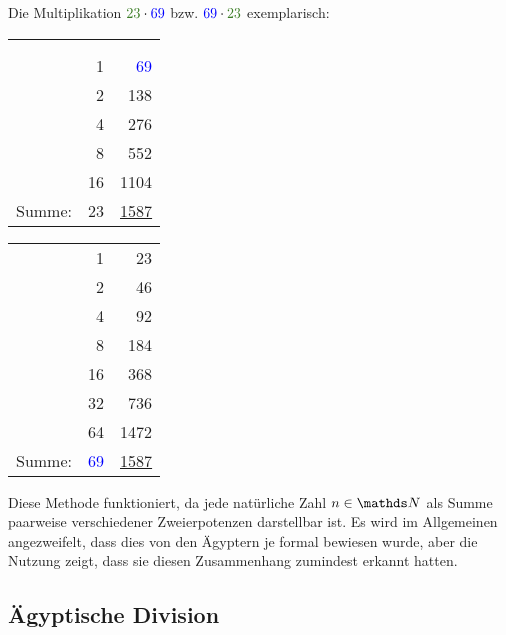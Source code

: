 	\begin{bsp}\label{Bsp: EgypMult}
		Die Multiplikation $\textcolor{OliveGreen}{23} \cdot \textcolor{blue}{69}$ bzw. $\textcolor{blue}{69} \cdot \textcolor{OliveGreen}{23}$ exemplarisch:\\
		\begin{minipage}{.5\textwidth}
				\begin{center}
				\begin{tabular}{r r r}
					&&\\
					&&\\
					\checkmark &1 & \textcolor{blue}{69}\\
					\checkmark &2 & 138\\
					\checkmark &4 & 276\\
					&8 & 552\\
					\checkmark &16 & 1104\\ \hline
					Summe: &\textcolor{OliveGreen}{23} & \underline{\underline{1587}}\\
				\end{tabular}
			\end{center}
		\end{minipage}
		\begin{minipage}{.5\textwidth}
			\begin{center}
				\begin{tabular}{r r r}
					\checkmark & 1 & \textcolor{OliveGreen}{23}\\
					& 2 & 46\\
					\checkmark & 4 & 92\\
					& 8 & 184\\
					& 16 & 368\\
					& 32 & 736\\
					\checkmark & 64 & 1472\\ \hline
					Summe: & \textcolor{blue}{69} & \underline{\underline{1587}}\\
				\end{tabular}
			\end{center}
		\end{minipage}
	
	\end{bsp}
	
	Diese Methode funktioniert, da jede natürliche Zahl $n \in \N$ als Summe paarweise verschiedener Zweierpotenzen darstellbar ist. Es wird im Allgemeinen angezweifelt, dass dies von den Ägyptern je formal bewiesen wurde, aber die Nutzung zeigt, dass sie diesen Zusammenhang zumindest erkannt hatten. \cite{Burton2011}
\subsection{Ägyptische Division}
